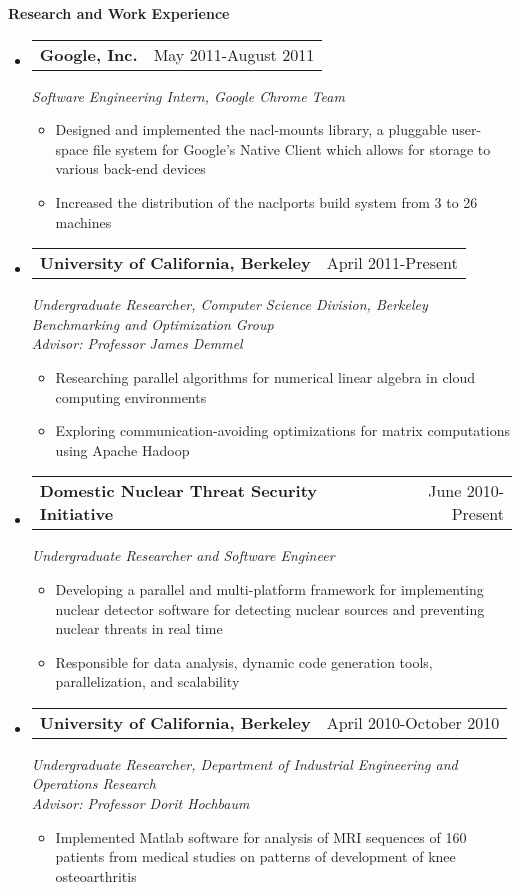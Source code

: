 \documentclass[letterpaper,11pt]{article}
\makeatletter
\newcommand{\resitem}[1]{\item #1 \vspace{-2pt}}
\newcommand{\resheading}[1]{{\large \colorbox{mygrey}{\begin{minipage}{\textwidth}{\textbf{#1 \vphantom{p\^{E}}}}\end{minipage}}}}
\newcommand{\expsubheading}[3]{
\begin{tabular*}{7.0in}{l@{\extracolsep{\fill}}r}
		\textbf{#1} & #2 \\
\end{tabular*}
\emph{#3}
\vspace{-6pt}
}
\makeatother
\begin{document}
\resheading{Research and Work Experience}
\begin{itemize}
\item
     \expsubheading{Google, Inc.}{May 2011-August 2011}{Software Engineering Intern, Google Chrome Team}
     \begin{itemize}
         \resitem{Designed and implemented the nacl-mounts library, a pluggable user-space file system for Google's Native Client which allows for storage to various back-end devices}
         \resitem{Increased the distribution of the naclports build system from 3 to 26 machines}
     \end{itemize}
     
\item
   \expsubheading{University of California, Berkeley}{April 2011-Present}{Undergraduate Researcher, Computer Science Division, Berkeley Benchmarking and Optimization Group \\
   Advisor: Professor James Demmel}
    \begin{itemize}
             \resitem{Researching parallel algorithms for numerical linear algebra in cloud computing environments}
         \resitem{Exploring communication-avoiding optimizations for matrix computations using Apache Hadoop}
     \end{itemize}
     
\item
    \expsubheading{Domestic Nuclear Threat Security Initiative}{June 2010-Present}{Undergraduate Researcher and Software Engineer}
    \begin{itemize}
         \resitem{Developing a parallel and multi-platform framework for implementing nuclear detector software for detecting nuclear sources and preventing nuclear threats in real time}
         \resitem{Responsible for data analysis, dynamic code generation tools, parallelization, and scalability}
     \end{itemize}    
     
\item
   \expsubheading{University of California, Berkeley}{April 2010-October 2010}{Undergraduate Researcher, Department of Industrial Engineering and Operations Research \\
   Advisor: Professor Dorit Hochbaum}
    \begin{itemize}
         \resitem{Implemented Matlab software for analysis of MRI sequences of 160 patients from medical studies on patterns of development of knee osteoarthritis}
     \end{itemize}
\end{itemize}
\end{document}
